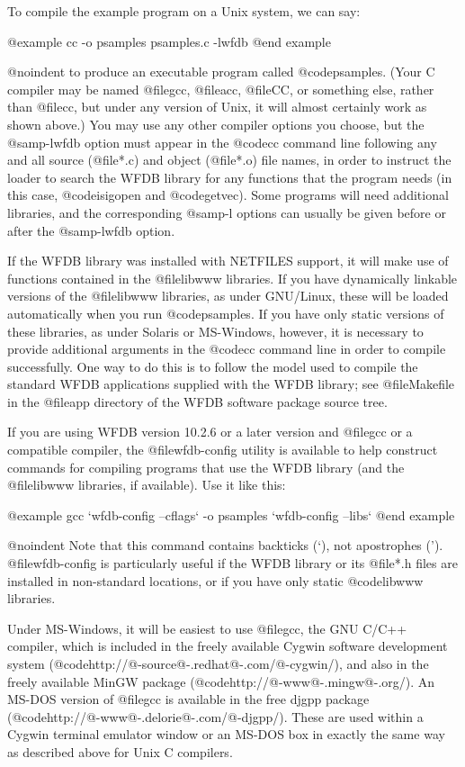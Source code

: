{{To compile the example program on a Unix system, we can say:

@example
cc -o psamples psamples.c -lwfdb
@end example

@noindent
to produce an executable program called @code{psamples}.  (Your C
compiler may be named @file{gcc}, @file{acc}, @file{CC}, or something
else, rather than @file{cc}, but under any version of Unix, it will
almost certainly work as shown above.)  You may use any other compiler
options you choose, but the @samp{-lwfdb} option must appear in the
@code{cc} command line following any and all source (@file{*.c}) and
object (@file{*.o}) file names, in order to instruct the loader to
search the WFDB library for any functions that the program needs (in
this case, @code{isigopen} and @code{getvec}).  Some programs will need
additional libraries, and the corresponding @samp{-l} options can
usually be given before or after the @samp{-lwfdb} option.

If the WFDB library was installed with NETFILES support, it will make
use of functions contained in the @file{libwww} libraries.  If you have
dynamically linkable versions of the @file{libwww} libraries, as under
GNU/Linux, these will be loaded automatically when you run
@code{psamples}.  If you have only static versions of these libraries,
as under Solaris or MS-Windows, however, it is necessary to provide
additional arguments in the @code{cc} command line in order to compile
successfully.  One way to do this is to follow the model used to compile
the standard WFDB applications supplied with the WFDB library; see
@file{Makefile} in the @file{app} directory of the WFDB software package
source tree.

If you are using WFDB version 10.2.6 or a later version and @file{gcc}
or a compatible compiler, the @file{wfdb-config} utility is available
to help construct commands for compiling programs that use the WFDB
library (and the @file{libwww} libraries, if available).  Use it like
this:

@example
gcc `wfdb-config --cflags` -o psamples `wfdb-config --libs`
@end example

@noindent
Note that this command contains backticks (`), not apostrophes (').
@file{wfdb-config} is particularly useful if the WFDB library or
its @file{*.h} files are installed in non-standard locations, or if
you have only static @code{libwww} libraries.

Under MS-Windows, it will be easiest to use @file{gcc}, the GNU C/C++
compiler, which is included in the freely available Cygwin software
development system (@code{http://@-source@-.redhat@-.com/@-cygwin/}),
and also in the freely available MinGW package
(@code{http://@-www@-.mingw@-.org/}).  An MS-DOS version of @file{gcc}
is available in the free djgpp package
(@code{http://@-www@-.delorie@-.com/@-djgpp/}). These are used within a
Cygwin terminal emulator window or an MS-DOS box in exactly the same way
as described above for Unix C compilers.  

}}
